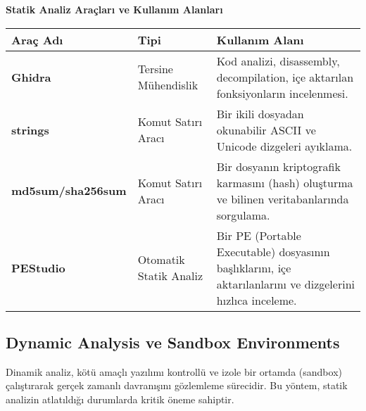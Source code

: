 \textbf{Statik Analiz Araçları ve Kullanım Alanları}

\begin{tabularx}{\textwidth}{|l|X|X|}
\hline
\textbf{Araç Adı} & \textbf{Tipi} & \textbf{Kullanım Alanı} \\
\hline
\textbf{Ghidra} & Tersine Mühendislik & Kod analizi, disassembly, decompilation, içe aktarılan fonksiyonların incelenmesi. \\
\hline
\textbf{strings} & Komut Satırı Aracı & Bir ikili dosyadan okunabilir ASCII ve Unicode dizgeleri ayıklama. \\
\hline
\textbf{md5sum/sha256sum} & Komut Satırı Aracı & Bir dosyanın kriptografik karmasını (hash) oluşturma ve bilinen veritabanlarında sorgulama. \\
\hline
\textbf{PEStudio} & Otomatik Statik Analiz & Bir PE (Portable Executable) dosyasının başlıklarını, içe aktarılanlarını ve dizgelerini hızlıca inceleme. \\
\hline
\end{tabularx}

\subsection{Dynamic Analysis ve Sandbox Environments}

Dinamik analiz, kötü amaçlı yazılımı kontrollü ve izole bir ortamda (sandbox) çalıştırarak gerçek zamanlı davranışını gözlemleme sürecidir. Bu yöntem, statik analizin atlatıldığı durumlarda kritik öneme sahiptir.

